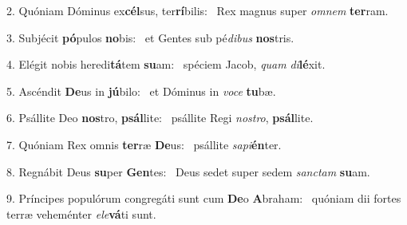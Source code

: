 2. Quóniam Dóminus ex\textbf{cél}sus, ter\textbf{rí}bilis: \ast\  Rex magnus super \textit{om}\textit{nem} \textbf{ter}ram.\

3. Subjécit \textbf{pó}pulos \textbf{no}bis: \ast\  et Gentes sub pé\textit{di}\textit{bus} \textbf{nos}tris.\

4. Elégit nobis heredi\textbf{tá}tem \textbf{su}am: \ast\  spéciem Jacob, \textit{quam} \textit{di}\textbf{lé}xit.\

5. Ascéndit \textbf{De}us in \textbf{jú}bilo: \ast\  et Dóminus in \textit{vo}\textit{ce} \textbf{tu}bæ.\

6. Psállite Deo \textbf{nos}tro, \textbf{psál}lite: \ast\  psállite Regi \textit{nos}\textit{tro}, \textbf{psál}lite.\

7. Quóniam Rex omnis \textbf{ter}ræ \textbf{De}us: \ast\  psállite \textit{sa}\textit{pi}\textbf{én}ter.\

8. Regnábit Deus \textbf{su}per \textbf{Gen}tes: \ast\  Deus sedet super sedem \textit{sanc}\textit{tam} \textbf{su}am.\

9. Príncipes populórum congregáti sunt cum \textbf{De}o \textbf{A}braham: \ast\  quóniam dii fortes terræ veheménter \textit{e}\textit{le}\textbf{vá}ti sunt.\

